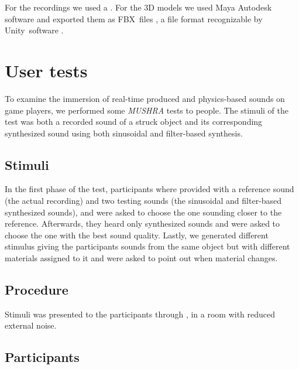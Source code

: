 For the recordings we used a . For the 3D models we used Maya Autodesk software \cite{bib:maya} and exported them as FBX\textregistered\ files \cite{bib:fbx}, a file format recognizable by Unity\textregistered\ software \cite{bib:unity}.

\section{User tests}

To examine the immersion of real-time produced and physics-based sounds on game players, we performed some \textit{MUSHRA} tests to people. The stimuli of the test was both a recorded sound of a struck object and its corresponding synthesized sound using both sinusoidal and filter-based synthesis.

\subsection{Stimuli}
In the first phase of the test, participants where provided with a reference sound (the actual recording) and two testing sounds (the sinusoidal and filter-based synthesized sounds), and were asked to choose the one sounding closer to the reference. Afterwards, they heard only synthesized sounds and were asked to choose the one with the best sound quality. Lastly, we generated different stimulus giving the participants sounds from the same object but with different materials assigned to it and were asked to point out when material changes. 


\subsection{Procedure}
Stimuli was presented to the participants through , in a room with reduced external noise.

\subsection{Participants}
